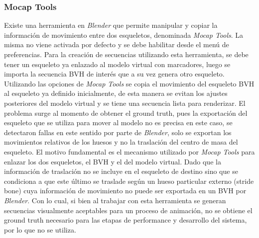 \subsubsection*{Mocap Tools}

Existe una herramienta en \textit{Blender} que permite manipular y copiar la información de movimiento entre dos esqueletos, denominada \textit{Mocap Tools}. La misma no viene activada por defecto y se debe habilitar desde el menú de preferencias. Para la creación de secuencias utilizando esta herramienta, se debe tener un esqueleto ya enlazado al modelo virtual con marcadores, luego se importa la secuencia BVH de interés que a su vez genera otro esqueleto. Utilizando las opciones de \textit{Mocap Tools}  se copia el movimiento del esqueleto BVH al esqueleto ya definido inicialmente, de esta manera se evitan los ajustes posteriores del modelo virtual y se tiene una secuencia lista para renderizar. 
El problema surge al momento de obtener el ground truth, pues la exportación del esqueleto que se utiliza para mover al modelo no es precisa en este caso, se detectaron fallas en este sentido por parte de \textit{Blender}, solo se exportan los movimientos relativos de los huesos y no la traslación del centro de masa del esqueleto. El motivo fundamental es el mecanismo utilizado por \textit{Mocap Tools} para enlazar los dos esqueletos, el BVH y el del modelo virtual. Dado que la información de traslación no se incluye en el esqueleto de destino sino que se condiciona a que este último se traslade según un hueso particular externo (\textsf{stride bone})  cuya información de movimiento no puede ser exportada en un BVH por \textit{Blender}. Con lo cual, si bien al trabajar con esta herramienta se generan secuencias visualmente aceptables para un proceso de animación, no se obtiene el ground truth necesario para las etapas de performance y desarrollo del sistema, por lo que no se utiliza.
 
    







